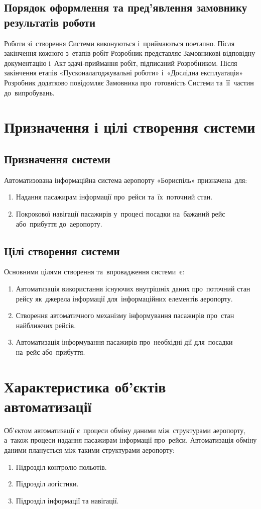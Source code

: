 \documentclass[
	a4paper,
	oneside,
	BCOR = 10mm,
	DIV = 12,
	12pt,
	headings = normal,
]{scrartcl}
\begin{document}
		\subsection{Порядок оформлення та пред'явлення замовнику результатів роботи}
			Роботи зі~створення Системи виконуються і~приймаються поетапно. Після закінчення кожного з~етапів робіт Розробник представляє Замовникові відповідну документацію і~Акт здачі-приймання робіт, підписаний Розробником. Після закінчення етапів «Пусконалагоджувальні роботи» і~«Дослідна експлуатація» Розробник додатково повідомляє Замовника про~готовність Системи та~її~частин до~випробувань.

	\section{Призначення і цілі створення системи}
		\subsection{Призначення системи}
			Автоматизована інформаційна система аеропорту «Бориспіль» призначена~для:
			\begin{enumerate}[noitemsep]
				\item Надання пасажирам інформації про~рейси та~їх~поточний стан.
				\item Покрокової навігації пасажирів у~процесі посадки на~бажаний рейс або~прибуття до~аеропорту. 
			\end{enumerate}

			\subsection{Цілі створення системи}
				Основними цілями створення та~впровадження системи~є:
				\begin{enumerate}[noitemsep]
					\item Автоматизація використання існуючих внутрішніх даних про~поточний стан рейсу як~джерела інформації для~інформаційних елементів аеропорту.
					\item Створення автоматичного механізму інформування пасажирів про~стан найближчих рейсів.
					\item Автоматизація інформування пасажирів про~необхідні дії для~посадки на~рейс або~прибуття.
				\end{enumerate}

	\section{Характеристика об'єктів автоматизації}
		Об'єктом автоматизації є~процеси обміну даними між~структурами аеропорту, а~також процеси надання пасажирам інформації про~рейси. Автоматизація обміну даними планується між такими структурами аеропорту:
		\begin{enumerate}[noitemsep]
			\item Підрозділ контролю польотів.
			\item Підрозділ логістики.
			\item Підрозділ інформації та навігації.
		\end{enumerate}
\end{document}

